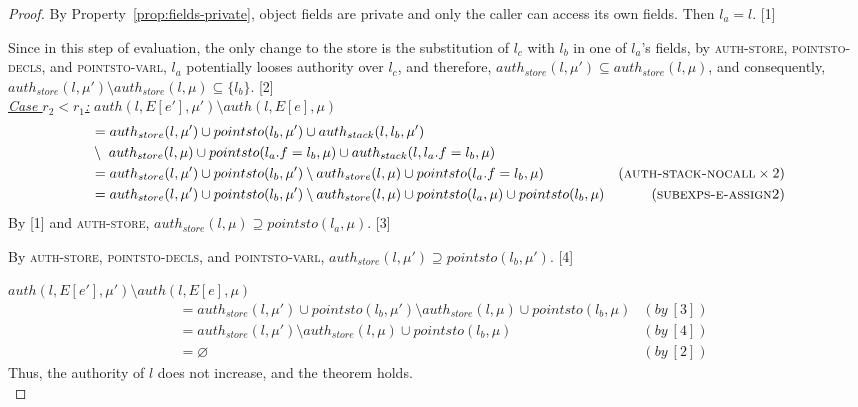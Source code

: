 \documentclass{llncs}
\begin{document}
\begin{proof}
By Property~\ref{prop:fields-private}, object fields are private and only the caller can access its own fields. Then $l_a = l$. \hspace{30pt} [1]

Since in this step of evaluation, the only change to the store is the substitution of $l_c$ with $l_b$ in one of $l_a$'s fields, by \textsc{auth-store}, \textsc{pointsto-decls}, and \textsc{pointsto-varl}, $l_a$ potentially looses authority over $l_c$, and therefore, $auth_{store}(l, \mu') \subseteq auth_{store}(l, \mu)$, and consequently, $auth_{store}(l, \mu') \setminus auth_{store}(l, \mu) \subseteq \{ l_b \}$. \hspace{40pt} [2]\\

\noindent\underline{\underline{\textit{Case $r_2 < r_1$:}}} $auth(l, E[e'], \mu') \setminus auth(l, E[e], \mu)$
\vspace{-7pt}
\begin{align*}
&= auth_{store}(l, \mu') \cup pointsto(l_b, \mu') \cup auth_{stack}(l, l_b, \mu')\\
&\setminus~auth_{store}(l, \mu) \cup pointsto(l_a.f = l_b, \mu) \cup auth_{stack}(l, l_a.f = l_b, \mu)\\
&= auth_{store}(l, \mu') \cup pointsto(l_b, \mu') \setminus auth_{store}(l, \mu) \cup pointsto(l_a.f = l_b, \mu) & (\textsc{auth-stack-nocall} \times 2)\\
&= auth_{store}(l, \mu') \cup pointsto(l_b, \mu') \setminus auth_{store}(l, \mu) \cup pointsto(l_a, \mu) \cup pointsto(l_b, \mu) & (\textsc{subexps-e-assign2})
\end{align*}
By [1] and \textsc{auth-store}, $auth_{store}(l, \mu) \supseteq pointsto(l_a, \mu)$. \hspace{220pt} [3]

\noindent By \textsc{auth-store}, \textsc{pointsto-decls}, and \textsc{pointsto-varl}, $auth_{store}(l, \mu') \supseteq pointsto(l_b, \mu')$. \hspace{70pt} [4]

\noindent$auth(l, E[e'], \mu') \setminus auth(l, E[e], \mu)$
\vspace{-7pt}
\begin{align*}
&= auth_{store}(l, \mu') \cup pointsto(l_b, \mu') \setminus auth_{store}(l, \mu) \cup pointsto(l_b, \mu) & (by~[3])\\
&= auth_{store}(l, \mu') \setminus auth_{store}(l, \mu) \cup pointsto(l_b, \mu) & (by~[4])\\
&= \varnothing & (by~[2])
\end{align*}
Thus, the authority of $l$ does not increase, and the theorem holds.\\


\end{proof}
\end{document}
